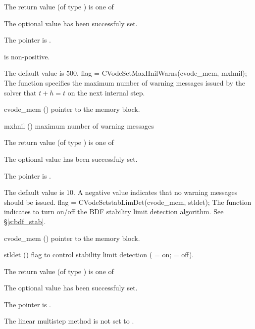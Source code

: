 {
  The return value  (of type ) is one of
  \begin{args}
  \item[\Id{SUCCESS}] 
    The optional value has been successfuly set.
  \item[\Id{CVS\_NO\_MEM}]
    The  pointer is .
  \item[\Id{CVS\_ILL\_INPUT}]
     is non-positive.
  \end{args}
}
{
  The default value is $500$.
}
{
flag = CVodeSetMaxHnilWarns(cvode\_mem, mxhnil);
}
{
  The function  specifies the maximum number of warning messages
  issued by the solver that $t+h=t$ on the next internal step.
}
{
  \begin{args}
  \item[cvode\_mem] ()
    pointer to the {\cvodes} memory block.
  \item[mxhnil] ()
    maximum number of warning messages
  \end{args}
}
{
  The return value  (of type ) is one of
  \begin{args}
  \item[\Id{SUCCESS}] 
    The optional value has been successfuly set.
  \item[\Id{CVS\_NO\_MEM}]
    The  pointer is .
  \end{args}
}
{
  The default value is $10$.
  A negative  value indicates that no warning messages should
  be issued.
}
{
flag = CVodeSetstabLimDet(cvode\_mem, stldet);
}
{
  The function  indicates to turn on/off
  the BDF stability limit detection algorithm. See \S\ref{s:bdf_stab}.
}
{
  \begin{args}
  \item[cvode\_mem] ()
    pointer to the {\cvodes} memory block.
  \item[stldet] ()
    flag to control stability limit detection ( = on;  = off).
  \end{args}
}
{
  The return value  (of type ) is one of
  \begin{args}
  \item[\Id{SUCCESS}] 
    The optional value has been successfuly set.
  \item[\Id{CVS\_NO\_MEM}]
    The  pointer is .
  \item[\Id{CVS\_ILL\_INPUT}]
    The linear multistep method is not set to .
  \end{args}
}
